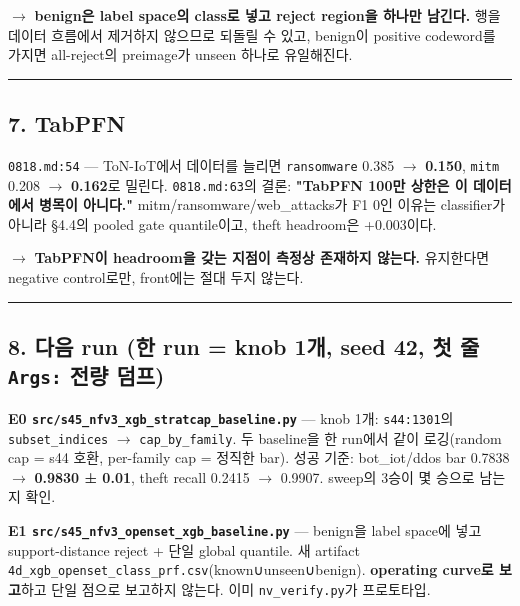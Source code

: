  \ensuremath{\rightarrow}  \textbf{benign은 label space의 class로 넣고 reject region을 하나만 남긴다.} 행을 데이터 흐름에서 제거하지 않으므로 되돌릴 수 있고, benign이 positive codeword를 가지면 all-reject의 preimage가 unseen 하나로 유일해진다.


\medskip\hrule\medskip
\subsection{7. TabPFN}
\texttt{0818.\allowbreak{}md:\allowbreak{}54} — ToN-IoT에서 데이터를 늘리면 \texttt{ransomwa\allowbreak{}re} 0.385 \ensuremath{\rightarrow} \textbf{0.150}, \texttt{mitm} 0.208 \ensuremath{\rightarrow} \textbf{0.162}로 밀린다. \texttt{0818.\allowbreak{}md:\allowbreak{}63}의 결론: \textbf{"TabPFN 100만 상한은 이 데이터에서 병목이 아니다."} mitm/\allowbreak{}ransomware/\allowbreak{}web\_\allowbreak{}attacks가 F1 0인 이유는 classifier가 아니라 §4.4의 pooled gate quantile이고, theft headroom은 +\allowbreak{}0.003이다.

 \ensuremath{\rightarrow}  \textbf{TabPFN이 headroom을 갖는 지점이 측정상 존재하지 않는다.} 유지한다면 negative control로만, front에는 절대 두지 않는다.


\medskip\hrule\medskip
\subsection{8. 다음 run (한 run =\allowbreak{} knob 1개, seed 42, 첫 줄 \texttt{Args:} 전량 덤프)}
\textbf{E0 \texttt{src/\allowbreak{}\allowbreak{}s45\_\allowbreak{}\allowbreak{}nfv3\_\allowbreak{}\allowbreak{}xgb\allowbreak{}\_\allowbreak{}\allowbreak{}stratca\allowbreak{}p\_\allowbreak{}\allowbreak{}baseli\allowbreak{}ne.\allowbreak{}py}} — knob 1개: \texttt{s44:1301\allowbreak{}}의 \texttt{subset\_\allowbreak{}\allowbreak{}i\allowbreak{}ndices}  \ensuremath{\rightarrow}  \texttt{cap\_\allowbreak{}\allowbreak{}by\_\allowbreak{}\allowbreak{}f\allowbreak{}amily}. 두 baseline을 한 run에서 같이 로깅(random cap =\allowbreak{} s44 호환, per-family cap =\allowbreak{} 정직한 bar). 성공 기준: bot\_\allowbreak{}iot/\allowbreak{}ddos bar 0.7838  \ensuremath{\rightarrow}  \textbf{0.9830 ± 0.01}, theft recall 0.2415  \ensuremath{\rightarrow}  0.9907. sweep의 3승이 몇 승으로 남는지 확인.

\textbf{E1 \texttt{src/\allowbreak{}\allowbreak{}s45\_\allowbreak{}\allowbreak{}nfv3\_\allowbreak{}\allowbreak{}ope\allowbreak{}nset\_\allowbreak{}\allowbreak{}xgb\allowbreak{}\_\allowbreak{}\allowbreak{}baselin\allowbreak{}e.\allowbreak{}py}} — benign을 label space에 넣고 support-distance reject +\allowbreak{} 단일 global quantile. 새 artifact \texttt{4d\_\allowbreak{}\allowbreak{}xgb\_\allowbreak{}\allowbreak{}o\allowbreak{}penset\_\allowbreak{}\allowbreak{}c\allowbreak{}lass\_\allowbreak{}\allowbreak{}prf\allowbreak{}.\allowbreak{}csv}(known∪unseen∪benign). \textbf{operating curve로 보고}하고 단일 점으로 보고하지 않는다. 이미 \texttt{nv\_\allowbreak{}\allowbreak{}verif\allowbreak{}y.\allowbreak{}py}가 프로토타입.


